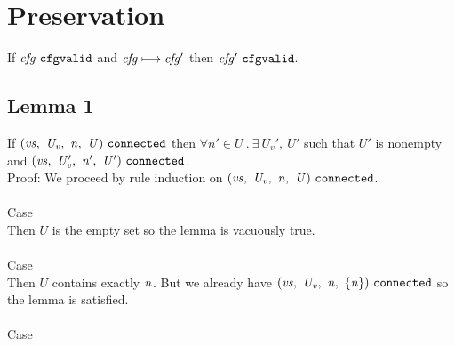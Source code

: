 \documentclass[12pt]{article}
\begin{document}
\section{Preservation}

\begin{thm}
If $\mathit{cfg}\ \mathtt{cfgvalid}$ and $\mathit{cfg} \longmapsto \mathit{cfg'}$ then
$\mathit{cfg'}\ \mathtt{cfgvalid}$.
\end{thm}

\subsection{Lemma 1}

If $(\mathit{vs},\ \mathit{U_v},\ \mathit{n},\ \mathit{U})\ \mathtt{connected}$ then $\forall n'
\in U\ .\ \exists\ U_v',\ U'$ such that $U'$ is nonempty and
$(\mathit{vs},\ \mathit{U_v'},\ \mathit{n'},\ \mathit{U'})\ \mathtt{connected}$.\\

Proof: We proceed by rule induction on
$(\mathit{vs},\ \mathit{U_v},\ \mathit{n},\ \mathit{U})\ \mathtt{connected}$.\\
\\

Case
\\

Then $U$ is the empty set so the lemma is vacuously true.\\
\\

Case
\\

Then $U$ contains exactly $\mathit{n}$. But we already have
$(\mathit{vs},\ \mathit{U_v},\ \mathit{n},\ \{\mathit{n}\})\ \mathtt{connected}$ so
the lemma is satisfied.\\
\\

Case
\\
\end{document}
